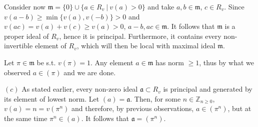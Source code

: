 \documentclass{article}
\newcommand{\numberset}{\mathbb}
\newcommand{\Z}{\numberset{Z}}
\newcommand{\aid}{\mathfrak{a}}
\newcommand{\mi}{\mathfrak{m}}
\begin{document}
Consider now $\mi=\{0\}\cup\{a\in R_v\ |\ v(a)>0\}$ and take $a,b\in\mi$, $c\in R_v$. 
Since $v(a-b)\geq\min\{v(a),v(-b)\}>0$ and $v(ac)=v(a)+v(c)\geq v(a)>0$, $a-b,ac\in\mi$. 
It follows that $\mi$ is a proper ideal of $R_v$, hence it is principal. 
Furthermore, it contains every non-invertible element of $R_v$, which will then 
be local with maximal ideal $\mi$.

Let $\pi\in\mi$ be s.t. $v(\pi)=1$. Any element $a\in\mi$ has norm $\geq 1$, 
thus by what we observed $a\in (\pi)$ and we are done.

$(c)$ As stated earlier, every non-zero ideal $\aid\subset R_v$ is principal and 
generated by its element of lowest norm. Let $(a)=\aid$. Then, for some 
$n\in\Z_{n\geq 0}$, $v(a)=n=v(\pi^n)$ and therefore, by previous observations, 
$a\in(\pi^n)$, but at the same time $\pi^n\in(a)$. It follows that $\aid=(\pi^n)$.

\printbibliography
\end{document}
